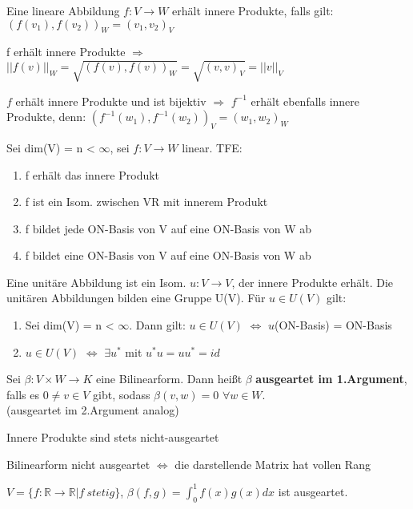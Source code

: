 \begin{theorem}
\leavevmode
\begin{compactitem}
\item Eine lineare Abbildung $f: V \to W$ erhält innere Produkte, falls gilt: $(f(v_1), f(v_2))_W = (v_1, v_2)_V$
\item f erhält innere Produkte $\Rightarrow$ $||f(v)||_W = \sqrt{(f(v), f(v))_W} = \sqrt{(v,v)_V} = ||v||_V$
\item $f$ erhält innere Produkte und ist bijektiv $\Rightarrow$ $f^{-1}$ erhält ebenfalls innere Produkte, denn: $(f^{-1}(w_1), f^{-1}(w_2))_V = (w_1, w_2)_W$
\item Sei dim(V) = n < $\infty$, sei $f: V \to W$ linear. TFE:
\begin{enumerate}
\item f erhält das innere Produkt
\item f ist ein Isom. zwischen VR mit innerem Produkt
\item f bildet jede ON-Basis von V auf eine ON-Basis von W ab
\item f bildet eine ON-Basis von V auf eine ON-Basis von W ab
\end{enumerate}
Eine unitäre Abbildung ist ein Isom. $u: V \to V$, der innere Produkte erhält.
Die unitären Abbildungen bilden eine Gruppe U(V). Für $u \in U(V)$ gilt:
\begin{enumerate}
\item Sei dim(V) = n < $\infty$. Dann gilt: $u \in U(V)$ $\Leftrightarrow$ $u$(ON-Basis) = ON-Basis
\item $u \in U(V)$ $\Leftrightarrow$ $\exists u^*$ mit $u^*u=uu^*=id$
\end{enumerate}
\end{compactitem}
\end{theorem}

\begin{definition}
Sei $\beta: V \times W \to K$ eine Bilinearform. Dann heißt $\beta$ \textbf{ausgeartet im 1.Argument}, falls es $0 \neq v \in V$ gibt, sodass $\beta(v,w) = 0$ $\forall w \in W$.\\
(ausgeartet im 2.Argument analog)
\end{definition}
\begin{remark}
\leavevmode
\begin{compactitem}
\item Innere Produkte sind stets nicht-ausgeartet
\item Bilinearform nicht ausgeartet $\Leftrightarrow$ die darstellende Matrix hat vollen Rang
\item $V = \{ f: \mathbb{R} \to \mathbb{R} | f~stetig \}$, $\beta(f,g) = \displaystyle\int_0^1 f(x) g(x) dx$ ist ausgeartet.
\end{compactitem}
\end{remark}